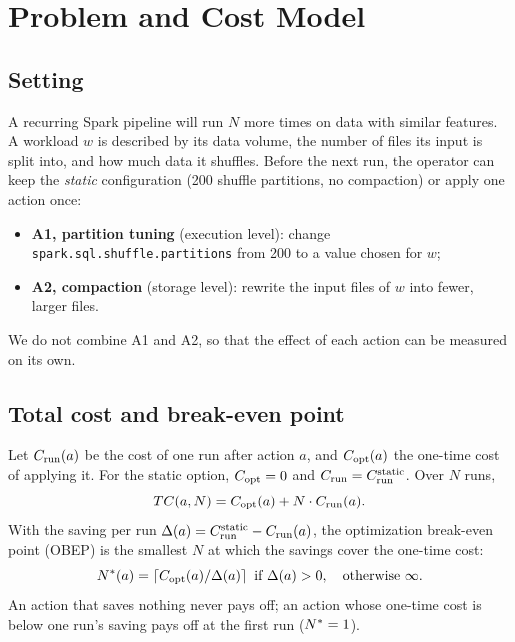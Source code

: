 \section{Problem and Cost Model}
\label{sec:problem}

\subsection{Setting}
A recurring Spark pipeline will run $N$ more times on data with similar features. A workload
$w$ is described by its data volume, the number of files its input is split into, and how much
data it shuffles. Before the next run, the operator can keep the \emph{static} configuration
(200 shuffle partitions, no compaction) or apply one action once:
\begin{itemize}
  \item \textbf{A1, partition tuning} (execution level): change
        \texttt{spark.sql.shuffle.partitions} from 200 to a value chosen for $w$;
  \item \textbf{A2, compaction} (storage level): rewrite the input files of $w$ into fewer,
        larger files.
\end{itemize}
We do not combine A1 and A2, so that the effect of each action can be measured on its own.

\subsection{Total cost and break-even point}
Let $C_{\mathrm{run}}(a)$ be the cost of one run after action $a$, and $C_{\mathrm{opt}}(a)$ the one-time cost of
applying it. For the static option, $C_{\mathrm{opt}} = 0$ and $C_{\mathrm{run}} = C_{\mathrm{run}}^{\mathrm{static}}$. Over $N$ runs,
\begin{equation}
  TC(a, N) = C_{\mathrm{opt}}(a) + N \cdot C_{\mathrm{run}}(a).
  \label{eq:tc}
\end{equation}
With the saving per run $\Delta(a) = C_{\mathrm{run}}^{\mathrm{static}} - C_{\mathrm{run}}(a)$, the optimization break-even point
(OBEP) is the smallest $N$ at which the savings cover the one-time cost:
\begin{equation}
  N^{*}(a) = \left\lceil C_{\mathrm{opt}}(a) / \Delta(a) \right\rceil \text{ if } \Delta(a) > 0,
  \quad \text{otherwise } \infty.
  \label{eq:obep}
\end{equation}
An action that saves nothing never pays off; an action whose one-time cost is below one run's
saving pays off at the first run ($N^{*} = 1$).

